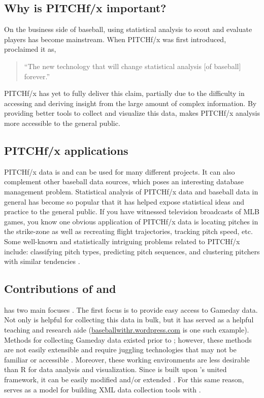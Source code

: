\begin{article}
\subsection{Why is PITCHf/x important?}

On the business side of baseball, using statistical analysis to scout
and evaluate players has become mainstream. When PITCHf/x was first
introduced, \citet{slate} proclaimed it as, \begin{quote} ``The new
  technology that will change statistical analysis [of baseball]
  forever.'' \end{quote}
PITCHf/x has yet to fully deliver this claim, partially due to the
difficulty in accessing and deriving insight from the large amount
of complex information. By providing better tools to collect and visualize
this data,  makes PITCHf/x analysis more accessible
to the general public.

\subsection{PITCHf/x applications}

PITCHf/x data is and can be used for many different projects. It can
also complement other baseball data sources, which poses an interesting
database management problem. Statistical analysis of PITCHf/x data and
baseball data in general has become so popular that it has helped
expose statistical ideas and practice to the general public. If you
have witnessed television broadcasts of MLB games, you know one obvious
application of PITCHf/x data is locating pitches in the strike-zone as
well as recreating flight trajectories, tracking pitch speed, etc.
Some well-known and statistically intriguing problems related to PITCHf/x
include: classifying pitch types, predicting pitch sequences, and
clustering pitchers with similar tendencies \citep{curve}.


\subsection[Contributions of pitchRx and XML2R]{Contributions of  and }

 has two main focuses \citep{pitchRx}. The first focus is
to provide easy access to Gameday data. Not only is 
helpful for collecting this data in bulk, but it has served as a
helpful teaching and research aide
(\href{http://baseballwithr.wordpress.com/}{baseballwithr.wordpress.com}
is one such example). Methods for collecting Gameday data existed
prior to ; however, these methods are not easily
extensible and require juggling technologies that may not be familiar
or accessible \citep{database}. Moreover, these working environments
are less desirable than R for data analysis and
visualization. Since  is built upon 's
united framework, it can be easily modified and/or extended
\citep{XML2R}. For this same reason,  serves as a model
for building XML data collection tools with .


\end{article}
